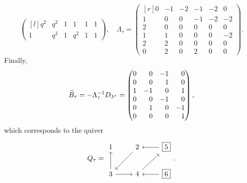 \begin{example}
\begin{equation}
\begin{pmatrix*}[l]
			q^{2} & q^{2}    & 1        & 1        & 1        & 1        \\
			1     & q^{2}    & 1        & q^{2}    & 1        & 1
		\end{pmatrix*}
		,\quad
		\Lambda_\tau = \begin{pmatrix*}[r]
			0 & -1 & -2 & -1 & -2 & 0  \\
			1 & 0  & 0  & -1 & -2 & -2 \\
			2 & 0  & 0  & 0  & 0  & 0  \\
			1 & 1  & 0  & 0  & 0  & -2 \\
			2 & 2  & 0  & 0  & 0  & 0  \\
			0 & 2  & 0  & 2  & 0  & 0
		\end{pmatrix*}.
	\end{equation}
	Finally,
	\begin{align*}
		\tB_\tau = -\Lambda_\tau \inv D_{\lambda^*} = \begin{pmatrix*}[r]
			                                              0 & 0 & -1 & 0\\
			                                              0 & 0 & 1 & 0\\
			                                              1 & -1 & 0 & 1\\
			                                              0 & 0 & -1 & 0\\
			                                              0 & 1 & 0 & -1\\
			                                              0 & 0 & 0 & 1
		                                              \end{pmatrix*},
	\end{align*}
	which corresponds to the quiver
	\begin{equation*}
		Q_{\tau} =
		\begin{tikzcd}
			1 & 2 \dlar & \boxed{5} \lar \\
			3 \uar \rar & 4 \urar & \boxed{6} \lar
		\end{tikzcd}
		.
	\end{equation*}


\end{example}
